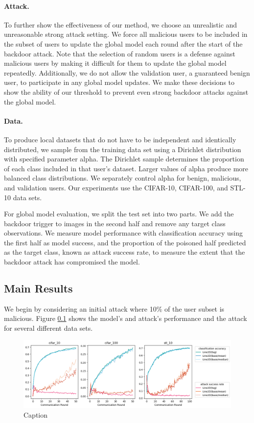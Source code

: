 \documentclass{article} %
\begin{document}
\paragraph{Attack.} To further show the effectiveness of our method, we choose an unrealistic and unreasonable strong attack setting. We force all malicious users to be included in the subset of users to update the global model each round after the start of the backdoor attack. Note that the selection of random users is a defense against malicious users by making it difficult for them to update the global model repeatedly. Additionally, we do not allow the validation user, a guaranteed benign user, to participate in any global model updates. We make these decisions to show the ability of our threshold to prevent even strong backdoor attacks against the global model. 


\paragraph{Data.} To produce local datasets that do not have to be independent and identically distributed, we sample from the training data set using a Dirichlet distribution with specified parameter alpha. The Dirichlet sample determines the proportion of each class included in that user's dataset. Larger values of alpha produce more balanced class distributions. We separately control alpha for benign, malicious, and validation users. Our experiments use the CIFAR-10, CIFAR-100, and STL-10 data sets.

For global model evaluation, we split the test set into two parts. We add the backdoor trigger to images in the second half and remove any target class observations. We measure model performance with classification accuracy using the first half as model success, and the proportion of the poisoned half predicted as the target class, known as attack success rate, to measure the extent that the backdoor attack has compromised the model.


%
\subsection{Main Results}

We begin by considering an initial attack where 10\% of the user subset is malicious. Figure \ref{} shows the model's and attack's performance and the attack for several different data sets. 

\begin{figure}[H]
    \centering
    \includegraphics[width=\textwidth]{make_article/make_visuals/visuals/accuracy--n_malicious1--dba0--beta0.2.png}
    \caption{Caption}
    \label{fig:my_label}
\end{figure}
\end{document}
